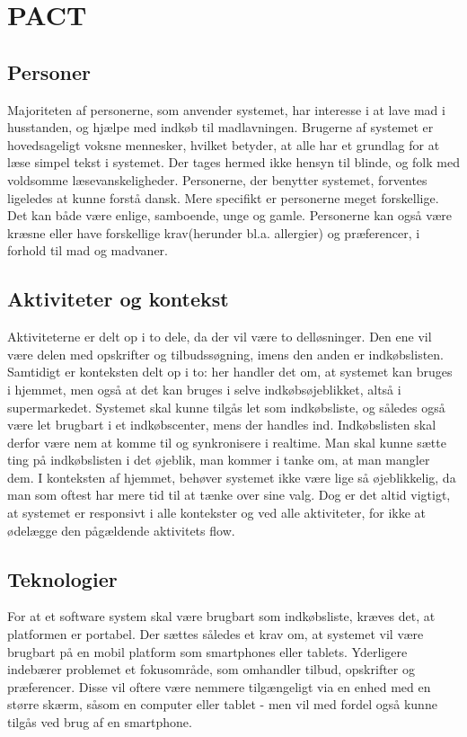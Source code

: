 \chapter{PACT}

\section{Personer}
Majoriteten af personerne, som anvender systemet, har interesse i at lave mad i husstanden, og hjælpe med indkøb til madlavningen.
Brugerne af systemet er hovedsageligt voksne mennesker, hvilket betyder, at alle har et grundlag for at læse simpel tekst i systemet.
Der tages hermed ikke hensyn til blinde, og folk med voldsomme læsevanskeligheder.
Personerne, der benytter systemet, forventes ligeledes at kunne forstå dansk.
Mere specifikt er personerne meget forskellige.
Det kan både være enlige, samboende, unge og gamle.
Personerne kan også være kræsne eller have forskellige krav(herunder bl.a. allergier) og præferencer, i forhold til mad og madvaner.

\section{Aktiviteter og kontekst}
Aktiviteterne er delt op i to dele, da der vil være to delløsninger. 
Den ene vil være delen med opskrifter og tilbudssøgning, imens den anden er indkøbslisten.
Samtidigt er konteksten delt op i to: her handler det om, at systemet kan bruges i hjemmet, men også at det kan bruges i selve indkøbsøjeblikket, altså i supermarkedet.
Systemet skal kunne tilgås let som indkøbsliste, og således også være let brugbart i et indkøbscenter, mens der handles ind.
Indkøbslisten skal derfor være nem at komme til og synkronisere i realtime.
Man skal kunne sætte ting på indkøbslisten i det øjeblik, man kommer i tanke om, at man mangler dem.
I konteksten af hjemmet, behøver systemet ikke være lige så øjeblikkelig, da man som oftest har mere tid til at tænke over sine valg.
Dog er det altid vigtigt, at systemet er responsivt i alle kontekster og ved alle aktiviteter, for ikke at ødelægge den pågældende aktivitets flow. 

\section{Teknologier}
For at et software system skal være brugbart som indkøbsliste, kræves det, at platformen er portabel.
Der sættes således et krav om, at systemet vil være brugbart på en mobil platform som smartphones eller tablets.
Yderligere indebærer problemet et fokusområde, som omhandler tilbud, opskrifter og præferencer.
Disse vil oftere være nemmere tilgængeligt via en enhed med en større skærm, såsom en computer eller tablet - men vil med fordel også kunne tilgås ved brug af en smartphone. 	